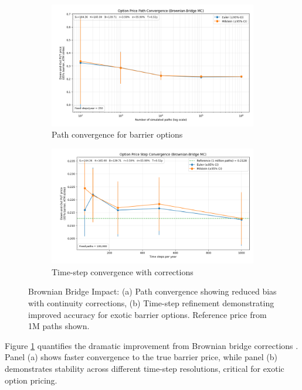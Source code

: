 \documentclass[11pt,a4paper]{article}
\begin{document}
\begin{figure}[H]
\centering
\begin{subfigure}{0.48\textwidth}
\includegraphics[width=\textwidth]{../charts/Constant Vol Charts/convergence_brownian_bridge.png}
\caption{Path convergence for barrier options}
\end{subfigure}
\hfill
\begin{subfigure}{0.48\textwidth}
\includegraphics[width=\textwidth]{../charts/Constant Vol Charts/exotic_brownian_bridge.png}
\caption{Time-step convergence with corrections}
\end{subfigure}
\caption{Brownian Bridge Impact: (a) Path convergence showing reduced bias with continuity corrections, (b) Time-step refinement demonstrating improved accuracy for exotic barrier options. Reference price from 1M paths shown.}
\label{fig:brownian_bridge}
\end{figure}

Figure \ref{fig:brownian_bridge} quantifies the dramatic improvement from Brownian bridge corrections \cite{Broadie1997}. Panel (a) shows faster convergence to the true barrier price, while panel (b) demonstrates stability across different time-step resolutions, critical for exotic option pricing.
\end{document}
